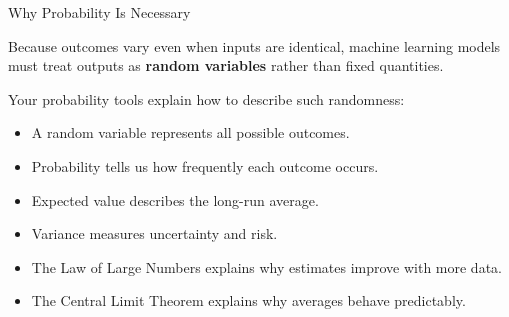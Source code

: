 \documentclass{beamer}
\begin{document}
\begin{frame}{Why Probability Is Necessary}

Because outcomes vary even when inputs are identical, machine learning models must
treat outputs as \textbf{random variables} rather than fixed quantities.

\medskip

Your probability tools explain how to describe such randomness:

\begin{itemize}
    \item A random variable represents all possible outcomes.
    \item Probability tells us how frequently each outcome occurs.
    \item Expected value describes the long-run average.
    \item Variance measures uncertainty and risk.
    \item The Law of Large Numbers explains why estimates improve with more data.
    \item The Central Limit Theorem explains why averages behave predictably.
\end{itemize}

\end{frame}
\end{document}
